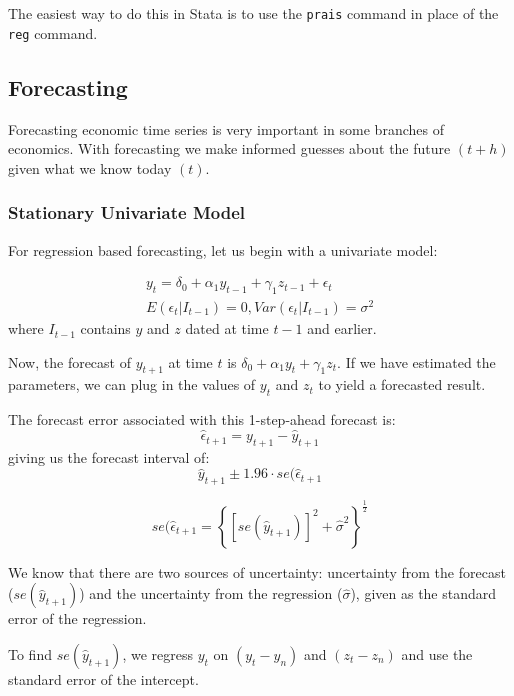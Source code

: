 \documentclass[11pt]{article}
\begin{document}
The easiest way to do this in Stata is to use the \lstinline{prais} command in place of the \lstinline{reg} command.

\subsection{Forecasting}

Forecasting economic time series is very important in some branches of economics. With forecasting we make informed guesses about the future $(t+h)$ given what we know today $(t)$.

\subsubsection{Stationary Univariate Model}

For regression based forecasting, let us begin with a univariate model:
\begin{mdframed}
    \begin{gather*}
        y_t = \delta_0 + \alpha_1 y_{t-1} + \gamma_1 z_{t-1} + \epsilon_t\\
        E(\epsilon_t|I_{t-1}) = 0, Var(\epsilon_t|I_{t-1})=\sigma^2
    \end{gather*}
    where $I_{t-1}$ contains $y$ and $z$ dated at time $t-1$ and earlier. 
\end{mdframed}

Now, the forecast of $y_{t+1}$ at time $t$ is $\delta_0 + \alpha_1 y_t + \gamma_1 z_t$. If we have estimated the parameters, we can plug in the values of $y_t$ and $z_t$ to yield a forecasted result.

The forecast error associated with this 1-step-ahead forecast is:
\[\hat{\epsilon}_{t+1} = y_{t+1} - \hat{y}_{t+1}\]
giving us the forecast interval of:
\[\hat{y}_{t+1} \pm 1.96 \cdot se(\hat{\epsilon}_{t+1}\]

\begin{mdframed}
    \begin{equation}
        \label{se epsilon forecast}
        se(\hat{\epsilon}_{t+1} = \left\{ [se(\hat{y}_{t+1})]^2 + \hat{\sigma}^2\right\}^{\frac{1}{2}}
    \end{equation}

    We know that there are two sources of uncertainty: uncertainty from the forecast ($se(\hat{y}_{t+1})$) and the uncertainty from the regression ($\hat{\sigma}$), given as the standard error of the regression.

    To find $se(\hat{y}_{t+1})$, we regress $y_t$ on $(y_t - y_n)$ and $(z_t - z_n)$ and use the standard error of the intercept.
\end{mdframed}
\end{document}
